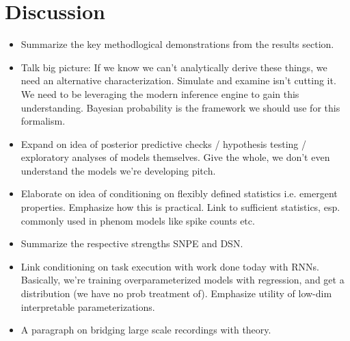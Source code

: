 \documentclass[11pt]{article}
\begin{document}
\section{Discussion}
\begin{itemize}
\item Summarize the key methodlogical demonstrations from the results section.
\item Talk big picture: If we know we can't analytically derive these things, we need an alternative characterization.  Simulate and examine isn't cutting it.  We need to be leveraging the modern inference engine to gain this understanding.  Bayesian probability is the framework we should use for this formalism.
\item Expand on idea of posterior predictive checks / hypothesis testing / exploratory analyses of models themselves.  Give the whole, we don't even understand the models we're developing pitch.
\item Elaborate on idea of conditioning on flexibly defined statistics i.e. emergent properties. Emphasize how this is practical.  Link to sufficient statistics, esp. commonly used in phenom models like spike counts etc.
\item Summarize the respective strengths SNPE and DSN.
\item Link conditioning on task execution with work done today with RNNs.  Basically, we're training overparameterized models with regression, and get a distribution (we have no prob treatment of). Emphasize utility of low-dim interpretable parameterizations.
\item A paragraph on bridging large scale recordings with theory.
\end{itemize}



\end{document}
